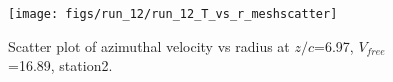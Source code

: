 \begin{figure}[H]
\centering
\texttt{[image: figs/run\_12/run\_12\_T\_vs\_r\_meshscatter]}
\caption{Scatter plot of azimuthal velocity vs radius at $z/c$=6.97, $V_{free}$=16.89, station2.}
\label{fig:run_12_T_vs_r_meshscatter}
\end{figure}


